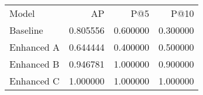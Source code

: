 \begin{tabular}{lrrr}
Model & AP & P@5 & P@10 \\
Baseline & 0.805556 & 0.600000 & 0.300000 \\
Enhanced A & 0.644444 & 0.400000 & 0.500000 \\
Enhanced B & 0.946781 & 1.000000 & 0.900000 \\
Enhanced C & 1.000000 & 1.000000 & 1.000000 \\
\end{tabular}
